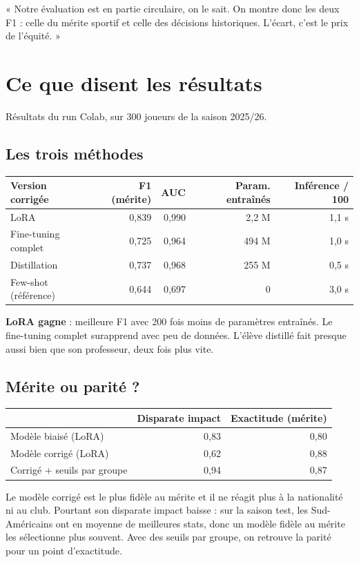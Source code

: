 \documentclass[11pt,a4paper]{article}
\begin{document}
\begin{oral}
« Notre évaluation est en partie circulaire, on le sait. On montre donc les deux F1 : celle du mérite sportif et celle des décisions historiques. L'écart, c'est le prix de l'équité. »
\end{oral}

\section{Ce que disent les résultats}
Résultats du run Colab, sur 300 joueurs de la saison 2025/26.

\subsection{Les trois méthodes}
\begin{tabularx}{\linewidth}{@{}X r r r r@{}}
\toprule
Version corrigée & F1 (mérite) & AUC & Param. entraînés & Inférence / 100 \\
\midrule
LoRA & 0,839 & 0,990 & 2,2 M & 1,1 s \\
Fine-tuning complet & 0,725 & 0,964 & 494 M & 1,0 s \\
Distillation & 0,737 & 0,968 & 255 M & 0,5 s \\
Few-shot (référence) & 0,644 & 0,697 & 0 & 3,0 s \\
\bottomrule
\end{tabularx}

\textbf{LoRA gagne} : meilleure F1 avec 200 fois moins de paramètres entraînés. Le fine-tuning complet surapprend avec peu de données. L'élève distillé fait presque aussi bien que son professeur, deux fois plus vite.

\subsection{Mérite ou parité ?}
\begin{tabularx}{\linewidth}{@{}X r r@{}}
\toprule
 & Disparate impact & Exactitude (mérite) \\
\midrule
Modèle biaisé (LoRA) & 0,83 & 0,80 \\
Modèle corrigé (LoRA) & 0,62 & 0,88 \\
Corrigé + seuils par groupe & 0,94 & 0,87 \\
\bottomrule
\end{tabularx}

Le modèle corrigé est le plus fidèle au mérite et il ne réagit plus à la nationalité ni au club. Pourtant son disparate impact baisse : sur la saison test, les Sud-Américains ont en moyenne de meilleures stats, donc un modèle fidèle au mérite les sélectionne plus souvent. Avec des seuils par groupe, on retrouve la parité pour un point d'exactitude.
\end{document}
